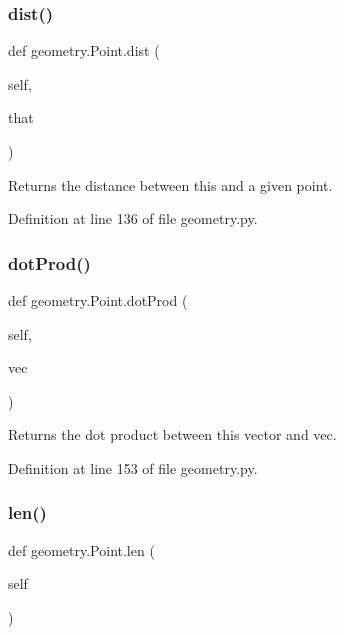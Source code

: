 \subsubsection{\texorpdfstring{dist()}{dist()}}
{\footnotesize\ttfamily def geometry.\+Point.\+dist (\begin{DoxyParamCaption}\item[{}]{self,  }\item[{}]{that }\end{DoxyParamCaption})}

\begin{DoxyVerb}Returns the distance between this and a given point.\end{DoxyVerb}
 

Definition at line 136 of file geometry.\+py.

\mbox{\label{classgeometry_1_1Point_a4df6e13ff003843f967090fb7f51cc85}} 
\subsubsection{\texorpdfstring{dot\+Prod()}{dotProd()}}
{\footnotesize\ttfamily def geometry.\+Point.\+dot\+Prod (\begin{DoxyParamCaption}\item[{}]{self,  }\item[{}]{vec }\end{DoxyParamCaption})}

\begin{DoxyVerb}Returns the dot product between this vector and vec.\end{DoxyVerb}
 

Definition at line 153 of file geometry.\+py.

\mbox{\label{classgeometry_1_1Point_ae6b226778d9c084c9369faa6dfd95398}} 
\subsubsection{\texorpdfstring{len()}{len()}}
{\footnotesize\ttfamily def geometry.\+Point.\+len (\begin{DoxyParamCaption}\item[{}]{self }\end{DoxyParamCaption})}

